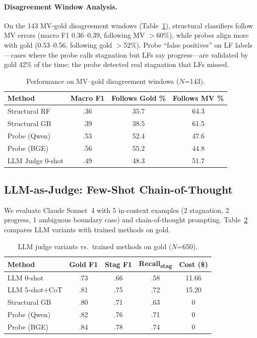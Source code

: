 \documentclass[11pt,a4paper]{article}
\begin{document}
\paragraph{Disagreement Window Analysis.}
On the 143 MV-gold disagreement windows (Table~\ref{tab:disagree-perf}), structural classifiers follow MV errors (macro F1 0.36--0.39, following MV $>$60\%), while probes align more with gold (0.53--0.56, following gold $>$52\%).
Probe ``false positives'' on LF labels---cases where the probe calls stagnation but LFs say progress---are validated by gold 42\% of the time: the probe detected real stagnation that LFs missed.

\begin{table}[t]
\centering
\small
\caption{Performance on MV--gold disagreement windows ($N$=143).}
\label{tab:disagree-perf}
\begin{tabular}{lccc}
\toprule
\textbf{Method} & \textbf{Macro F1} & \textbf{Follows Gold \%} & \textbf{Follows MV \%} \\
\midrule
Structural RF  & .36 & 35.7 & 64.3 \\
Structural GB  & .39 & 38.5 & 61.5 \\
Probe (Qwen)   & .53 & 52.4 & 47.6 \\
Probe (BGE)    & .56 & 55.2 & 44.8 \\
LLM Judge 0-shot & .49 & 48.3 & 51.7 \\
\bottomrule
\end{tabular}
\end{table}

\subsection{LLM-as-Judge: Few-Shot Chain-of-Thought}
\label{sec:llm-judge}

We evaluate Claude Sonnet~4 with 5 in-context examples (2 stagnation, 2 progress, 1 ambiguous boundary case) and chain-of-thought prompting.
Table~\ref{tab:llm-judge} compares LLM variants with trained methods on gold.

\begin{table}[t]
\centering
\small
\caption{LLM judge variants vs.\ trained methods on gold ($N$=650).}
\label{tab:llm-judge}
\begin{tabular}{lcccc}
\toprule
\textbf{Method} & \textbf{Gold F1} & \textbf{Stag F1} & \textbf{Recall\textsubscript{stag}} & \textbf{Cost (\$)} \\
\midrule
LLM 0-shot      & .73 & .66 & .58 & 11.66 \\
LLM 5-shot+CoT  & .81 & .75 & .72 & 15.20 \\
\midrule
Structural GB   & .80 & .71 & .63 & 0 \\
Probe (Qwen)    & .82 & .76 & .71 & 0 \\
Probe (BGE)     & .84 & .78 & .74 & 0 \\
\bottomrule
\end{tabular}
\end{table}
\end{document}
